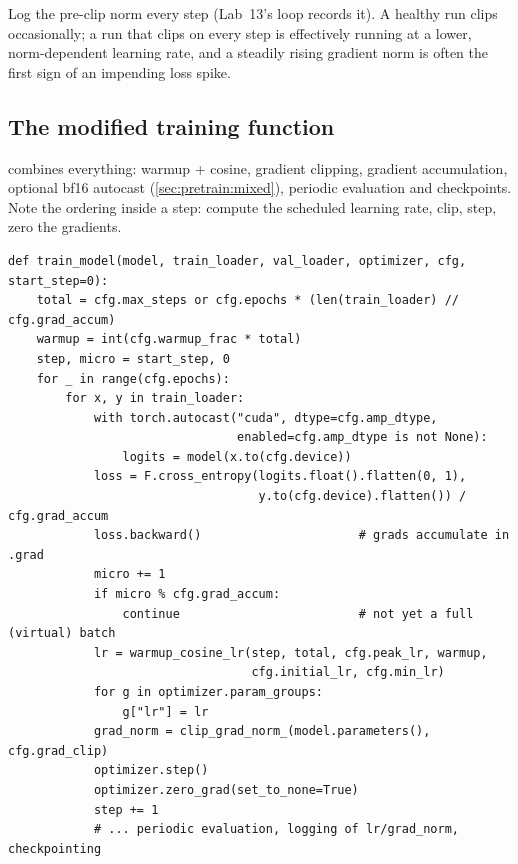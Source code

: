 \begin{pitfall}
Log the pre-clip norm every step (Lab~13's loop records it). A healthy run clips occasionally;
a run that clips on every step is effectively running at a lower, norm-dependent learning rate,
and a steadily rising gradient norm is often the first sign of an impending loss spike.
\end{pitfall}

\subsection{The modified training function}\label{sec:pretrain:trainfn}

 combines everything: warmup + cosine, gradient clipping,
gradient accumulation, optional bf16 autocast (\cref{sec:pretrain:mixed}), periodic evaluation
and checkpoints. Note the ordering inside a step: compute the scheduled learning rate, clip,
step, zero the gradients.

\begin{lstlisting}[caption={The full training function from Lab 13 (abridged).},label={lst:pretrain:trainmodel}]
def train_model(model, train_loader, val_loader, optimizer, cfg, start_step=0):
    total = cfg.max_steps or cfg.epochs * (len(train_loader) // cfg.grad_accum)
    warmup = int(cfg.warmup_frac * total)
    step, micro = start_step, 0
    for _ in range(cfg.epochs):
        for x, y in train_loader:
            with torch.autocast("cuda", dtype=cfg.amp_dtype,
                                enabled=cfg.amp_dtype is not None):
                logits = model(x.to(cfg.device))
            loss = F.cross_entropy(logits.float().flatten(0, 1),
                                   y.to(cfg.device).flatten()) / cfg.grad_accum
            loss.backward()                      # grads accumulate in .grad
            micro += 1
            if micro % cfg.grad_accum:
                continue                         # not yet a full (virtual) batch
            lr = warmup_cosine_lr(step, total, cfg.peak_lr, warmup,
                                  cfg.initial_lr, cfg.min_lr)
            for g in optimizer.param_groups:
                g["lr"] = lr
            grad_norm = clip_grad_norm_(model.parameters(), cfg.grad_clip)
            optimizer.step()
            optimizer.zero_grad(set_to_none=True)
            step += 1
            # ... periodic evaluation, logging of lr/grad_norm, checkpointing
\end{lstlisting}

